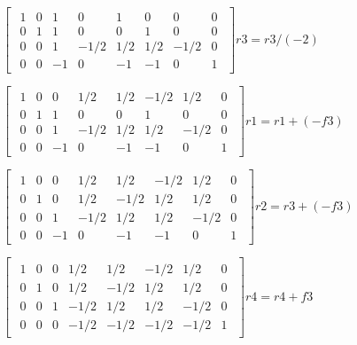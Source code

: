 \singlespacing

\begin{math}
    \begin{bmatrix}
        \begin{array}{cccc|cccc}
            1 & 0 & 1  & 0    & 1   & 0   & 0    & 0 \\
            0 & 1 & 1  & 0    & 0   & 1   & 0    & 0 \\
            0 & 0 & 1  & -1/2 & 1/2 & 1/2 & -1/2 & 0 \\
            0 & 0 & -1 & 0    & -1  & -1  & 0    & 1
        \end{array}
    \end{bmatrix}
    r3 = r3 / (-2)
\end{math}

\singlespacing

\begin{math}
    \begin{bmatrix}
        \begin{array}{cccc|cccc}
            1 & 0 & 0  & 1/2  & 1/2 & -1/2 & 1/2  & 0 \\
            0 & 1 & 1  & 0    & 0   & 1    & 0    & 0 \\
            0 & 0 & 1  & -1/2 & 1/2 & 1/2  & -1/2 & 0 \\
            0 & 0 & -1 & 0    & -1  & -1   & 0    & 1
        \end{array}
    \end{bmatrix}
    r1 = r1 + (-f3)
\end{math}

\singlespacing

\begin{math}
    \begin{bmatrix}
        \begin{array}{cccc|cccc}
            1 & 0 & 0  & 1/2  & 1/2  & -1/2 & 1/2  & 0 \\
            0 & 1 & 0  & 1/2  & -1/2 & 1/2  & 1/2  & 0 \\
            0 & 0 & 1  & -1/2 & 1/2  & 1/2  & -1/2 & 0 \\
            0 & 0 & -1 & 0    & -1   & -1   & 0    & 1
        \end{array}
    \end{bmatrix}
    r2 = r3 + (-f3)
\end{math}

\singlespacing

\begin{math}
    \begin{bmatrix}
        \begin{array}{cccc|cccc}
            1 & 0 & 0 & 1/2  & 1/2  & -1/2 & 1/2  & 0 \\
            0 & 1 & 0 & 1/2  & -1/2 & 1/2  & 1/2  & 0 \\
            0 & 0 & 1 & -1/2 & 1/2  & 1/2  & -1/2 & 0 \\
            0 & 0 & 0 & -1/2 & -1/2 & -1/2 & -1/2 & 1
        \end{array}
    \end{bmatrix}
    r4 = r4 + f3
\end{math}

